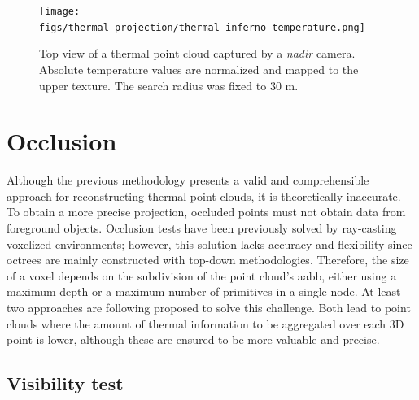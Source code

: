 \begin{figure}[ht]
	\centering
	\texttt{[image: figs/thermal\_projection/thermal\_inferno\_temperature.png]}
	\caption{Top view of a thermal point cloud captured by a \textit{nadir} camera. Absolute temperature values are normalized and mapped to the upper texture. The search radius was fixed to 30 \si{\meter}.}
	\label{fig:thermal_point_cloud_top_view}
\end{figure}

\section{Occlusion}

Although the previous methodology presents a valid and comprehensible approach for reconstructing thermal point clouds, it is theoretically inaccurate. To obtain a more precise projection, occluded points must not obtain data from foreground objects. Occlusion tests have been previously solved by ray-casting voxelized environments; however, this solution lacks accuracy and flexibility since octrees are mainly constructed with top-down methodologies. Therefore, the size of a voxel depends on the subdivision of the point cloud's \acrshort{aabb}, either using a maximum depth or a maximum number of primitives in a single node. At least two approaches are following proposed to solve this challenge. Both lead to point clouds where the amount of thermal information to be aggregated over each 3D point is lower, although these are ensured to be more valuable and precise.

\subsection{Visibility test}

